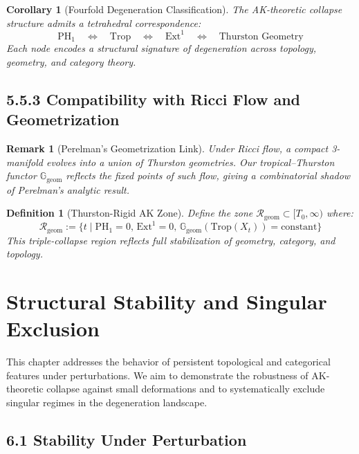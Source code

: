\documentclass[11pt]{article}
\newtheorem{definition}[theorem]{Definition}
\newtheorem{remark}[theorem]{Remark}
\newtheorem{corollary}[theorem]{Corollary}
\begin{document}
\begin{corollary}[Fourfold Degeneration Classification]
The AK-theoretic collapse structure admits a tetrahedral correspondence:
\[
\mathrm{PH}_1 \quad \Longleftrightarrow \quad \mathrm{Trop} \quad \Longleftrightarrow \quad \mathrm{Ext}^1 \quad \Longleftrightarrow \quad \text{Thurston Geometry}
\]
Each node encodes a structural signature of degeneration across topology, geometry, and category theory.
\end{corollary}

\subsection{5.5.3 Compatibility with Ricci Flow and Geometrization}

\begin{remark}[Perelman's Geometrization Link]
Under Ricci flow, a compact 3-manifold evolves into a union of Thurston geometries. Our tropical–Thurston functor \( \mathbb{G}_\mathrm{geom} \) reflects the fixed points of such flow, giving a combinatorial shadow of Perelman's analytic result.
\end{remark}

\begin{definition}[Thurston-Rigid AK Zone]
Define the zone \( \mathcal{R}_\mathrm{geom} \subset [T_0, \infty) \) where:
\[
\mathcal{R}_\mathrm{geom} := \{ t \mid \mathrm{PH}_1 = 0,\, \mathrm{Ext}^1 = 0,\, \mathbb{G}_\mathrm{geom}(\mathrm{Trop}(X_t)) = \text{constant} \}
\]
This triple-collapse region reflects full stabilization of geometry, category, and topology.
\end{definition}


\section{Structural Stability and Singular Exclusion}

This chapter addresses the behavior of persistent topological and categorical features under perturbations. We aim to demonstrate the robustness of AK-theoretic collapse against small deformations and to systematically exclude singular regimes in the degeneration landscape.

\subsection{6.1 Stability Under Perturbation}
\end{document}
